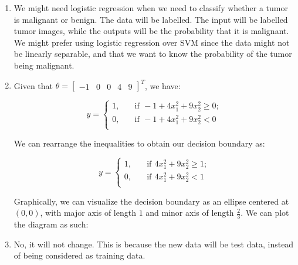 \documentclass[11pt,fancychapters]{article}
\begin{document}
\begin{enumerate}[label=\textbf{(\alph*)}]
	
	\item We might need logistic regression when we need to classify whether a tumor is malignant or benign. The data will be labelled. The input will be labelled tumor images, while the outputs will be the probability that it is malignant. We might prefer using logistic regression over SVM since the data might not be linearly separable, and that we want to know the probability of the tumor being malignant.
	
	\item Given that $\theta = \begin{bmatrix}-1 & 0 & 0 & 4 & 9\end{bmatrix}^T$, we have:
	
	\begin{equation*}
		y = \begin{cases}
			1, \quad &\text{if} \, ~ -1 + 4x_1^2 + 9x_2^2 \geq 0; \\
			0, \quad &\text{if} \, ~ -1 + 4x_1^2 + 9x_2^2 < 0 \\
		\end{cases}	
	\end{equation*}
	
	We can rearrange the inequalities to obtain our decision boundary as:
	
	\begin{equation*}
		y = \begin{cases}
			1, \quad &\text{if} \, ~ 4x_1^2 + 9x_2^2 \geq 1; \\
			0, \quad &\text{if} \, ~ 4x_1^2 + 9x_2^2 < 1 \\
		\end{cases}	
	\end{equation*}
	
	Graphically, we can visualize the decision boundary as an ellipse centered at $(0, 0)$, with major axis of length $1$ and minor axis of length $\frac{2}{3}$. We can plot the diagram as such:
	
	\begin{figure}[!h]
		\centering
	\end{figure}

	\pagebreak
	
	\item No, it will not change. This is because the new data will be test data, instead of being considered as training data.
	
\end{enumerate}
\end{document}
